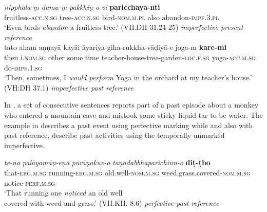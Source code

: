 \documentclass[output=paper,hidelinks]{langscibook}
\begin{document}
\begin{exe}
\begin{xlist}
\begin{xlist}
\begin{exe}
\begin{exe}
\begin{exe}
\begin{exe}
\begin{xlist}
\begin{exe}
\begin{xlist}
\begin{exe}
\ex
\label{tree} 
\begin{xlist} 
\ex
\gll
\emph{nipphala-\d{m}} \emph{duma-\d{m}} \emph{pakkhiṇ-o} \emph{vi} \textbf{paricchaya-nti}\\
fruitless-\textsc{acc.n.sg} tree-\textsc{acc.n.sg} bird-\textsc{nom.m.pl} also abandon-\textsc{impf.}\textsc{3.pl}\\
\glt `Even birds \emph{abandon} a fruitless tree.' (VH.DH 31.24-25) \hfill{\emph{imperfective present reference}} \label{tree1}\\

\ex
\gll tato aham aṇṇayā kayāi
 āyariya-giha-rukkha-vāḍiyā-e joga-m \textbf{kare-mi}\\
 then i.\textsc{nom.sg} other {some time} teacher-house-tree-garden-\textsc{loc.f.sg} yoga-\textsc{acc.m.sg} do-\textsc{impf.}\textsc{1.sg}\\
\glt `Then, sometimes, I \emph{would perform} Yoga in the orchard at my teacher's house.' (VH:DH 37.1) \hfill{\emph{imperfective past reference}} \label{yoga}

\z
\z


In , a set of consecutive sentences reports part of a past episode about a monkey who entered a mountain cave and
mistook some sticky liquid tar to be water. The example in  describes a past event using perfective marking while  and  also with past reference, describe past activities using the temporally unmarked imperfective.\largerpage

\ea
\label{monkey}
\ea
\gll \emph{te-ṇa} \emph{palāyamāṇ-eṇa} \emph{purāṇakuv-o} \emph{taṇadabbhaparichinn-o} \textbf{diṭ-ṭho}\\
that-\textsc{erg.m.sg} running-\textsc{erg.m.sg} old.well-\textsc{nom.m.sg} weed.grass.covered-\textsc{nom.m.sg} notice-\textsc{perf.m.sg}\\
\glt `That running one \emph{noticed} an old well\\
 covered with weed and grass.' (VH.KH. 8.6) \hfill{\emph{perfective past reference}} \label{notice}


\end{xlist}
\end{exe}
\end{xlist}
\end{exe}
\end{xlist}
\end{exe}
\end{exe}
\end{exe}
\end{exe}
\end{xlist}
\end{xlist}
\end{exe}
\end{document}
